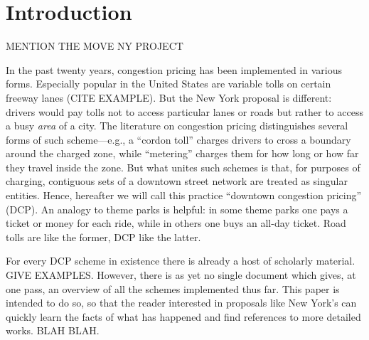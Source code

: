\section{Introduction}

MENTION THE MOVE NY PROJECT

In the past twenty years, congestion pricing has been implemented in various forms. Especially popular in the United States are variable tolls on certain freeway lanes (CITE EXAMPLE). But the New York proposal is different: drivers would pay tolls not to access particular lanes or roads but rather to access a busy \emph{area} of a city.  The literature on congestion pricing distinguishes several forms of such scheme---e.g., a ``cordon toll'' charges drivers to cross a boundary around the charged zone, while ``metering'' charges them for how long or how far they travel inside the zone. But what unites such schemes is that, for purposes of charging, contiguous sets of a downtown street network are treated as singular entities. Hence, hereafter we will call this practice ``downtown congestion pricing'' (DCP). An analogy to theme parks is helpful: in some theme parks one pays a ticket or money for each ride, while in others one buys an all-day ticket. Road tolls are like the former, DCP like the latter.


For every DCP scheme in existence there is already a host of scholarly material. GIVE EXAMPLES. However, there is as yet no single document which gives, at one pass, an overview of all the schemes implemented thus far. This paper is intended to do so, so that the reader interested in proposals like New York's can quickly learn the facts of what has happened and find references to more detailed works. BLAH BLAH.

